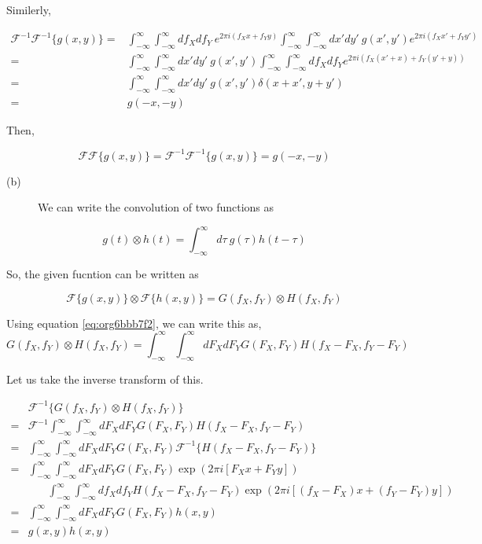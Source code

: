 \documentclass[a4paper,11pt]{article}
\begin{document}
Similerly,

\begin{equation*}
\begin{split}
\mathcal{F}^{-1}\mathcal{F}^{-1}\{g(x,y)\} = & \int_{-\infty}^\infty \int_{-\infty}^\infty df_X df_Y ~e^{2\pi i(f_Xx+f_Yy)} \int_{-\infty}^\infty \int_{-\infty}^\infty dx'dy' ~g(x',y') e^{2\pi i(f_Xx'+f_Yy')}\\
= & \int_{-\infty}^\infty \int_{-\infty}^\infty dx'dy'~g(x',y') \int_{-\infty}^\infty \int_{-\infty}^\infty df_Xdf_Ye^{2\pi i(f_X(x'+x)+f_Y(y'+y))} \\
= & \int_{-\infty}^\infty \int_{-\infty}^\infty dx'dy'~g(x',y') \delta(x+x',y+y') \\
= & g(-x,-y)
\end{split}
\end{equation*}

Then,

$$\mathcal{F}\mathcal{F}\{g(x,y)\} = \mathcal{F}^{-1}\mathcal{F}^{-1}\{g(x,y)\} = g(-x,-y)$$

\begin{description}
\item[{(b)}] We can write the convolution of two functions as
\end{description}

\begin{equation}
\label{eq:org6bbb7f2}
g(t)\otimes h(t) = \int_{-\infty}^{\infty} d\tau~g(\tau) h(t-\tau)
\end{equation}

So, the given fucntion can be written as

$$\mathcal{F}\{g(x,y)\} \otimes \mathcal{F}\{h(x,y)\} = G(f_X,f_Y) \otimes H(f_X,f_Y) $$

Using equation \ref{eq:org6bbb7f2}, we can write this as,
\begin{equation}
\label{eq:org335736d}
G(f_X,f_Y) \otimes H(f_X,f_Y) = \int_{-\infty}^{\infty} \int_{-\infty}^{\infty} dF_X dF_Y G(F_X,F_Y) H(f_X-F_X,f_Y-F_Y)
\end{equation}

Let us take the inverse transform of this.

\begin{equation*}
\begin{split}
& \mathcal{F}^{-1}  \{G(f_X,f_Y)\otimes H(f_X,f_Y)\} \\ = & \mathcal{F}^{-1}\int_{-\infty}^{\infty} \int_{-\infty}^{\infty} dF_X dF_Y G(F_X,F_Y) H(f_X-F_X,f_Y-F_Y) \\
= & \int_{-\infty}^{\infty} \int_{-\infty}^{\infty} dF_X dF_Y G(F_X,F_Y) \mathcal{F}^{-1}\{H(f_X-F_X,f_Y-F_Y)\} \\
= & \int_{-\infty}^{\infty}\int_{-\infty}^{\infty} dF_X dF_Y G(F_X,F_Y) \exp\left(2\pi i\left[F_Xx+F_Yy\right]\right) \\  & ~~~~~~~~ \int_{-\infty}^{\infty} \int_{-\infty}^{\infty} df_X df_Y H(f_X-F_X,f_Y-F_Y)\exp\left(2\pi i\left[(f_X-F_X)x+(f_Y-F_Y)y\right] \right) \\
= & \int_{-\infty}^{\infty} \int_{-\infty}^{\infty} dF_X dF_Y G(F_X,F_Y) h(x,y) \\
= & g(x,y) h(x,y)
\end{split}
\end{equation*}
\end{document}
